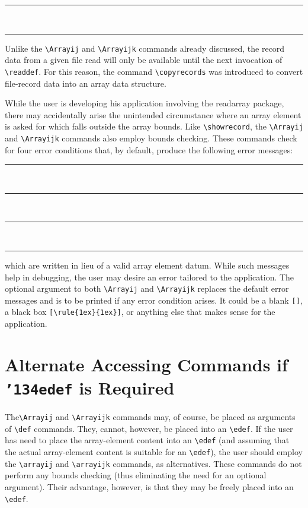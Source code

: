 \documentclass{article}
\newcommand\rl{\rule{1em}{0in}}
\def\rdar{\textsf{readarray}}
\let\vb\verb
\def\bs{{\ttfamily\char'134}}
\newcommand\margcmd[1]{\marginpar{\hfill\ttfamily\char'134#1}}
\begin{document}
\def\nrecords{1}
\rl{}\\
\rl{}

Unlike the \vb|\Arrayij| and \verb|\Arrayijk| commands already
discussed, the record data from a given file read will only be available
until the next invocation of \verb|\readdef|.  For this reason, the
command \verb|\copyrecords| was introduced to convert file-record data
into an array data structure.

While the user is developing his application involving the {\rdar}
package, there may accidentally arise the unintended circumstance where
an array element is asked for which falls outside the array bounds.
Like \verb|\showrecord|, the \verb|\Arrayij| and \verb|\Arrayijk|
commands also employ bounds checking. These commands check for
four error conditions that, by default, produce the following error
messages:\\
\rl{}\\
\rl{}\\
\rl{}\\
\rl{}

which are written in lieu of a valid array element datum.  While such
messages help in debugging, the user may desire an error tailored to the
application.  The optional argument to both \vb|\Arrayij| and
\vb|\Arrayijk| replaces the default error messages and is to be printed
if any error condition arises.  It could be a blank \vb|[]|, a black
box \vb|[\rule{1ex}{1ex}]|, or anything else that makes sense for the
application.

\section{Alternate Accessing Commands if \texttt{\bs edef} is Required}

The\verb|\Arrayij| and \verb|\Arrayijk| commands may, of course, be
placed as arguments of \verb|\def| commands.  They, cannot, however, be
placed into an \verb|\edef|.  If the user has need to place the
array-element content into an \verb|\edef| (and assuming that the
actual array-element content is suitable for an \verb|\edef|), the user
should employ the \verb|\arrayij| and \verb|\arrayijk| commands, as
alternatives.
\margcmd{arrayij}\margcmd{arrayijk}%
These commands do not perform any bounds checking (thus eliminating the
need for an optional argument).  Their advantage, however, is that they
may be freely placed into an
\verb|\edef|.
\end{document}
